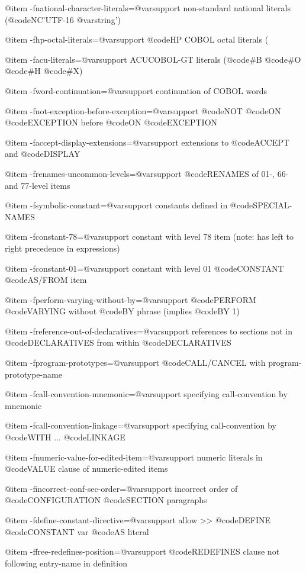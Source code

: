 @item -fnational-character-literals=@var{support}
non-standard national literals (@code{NC'UTF-16 @var{string}'})

@item -fhp-octal-literals=@var{support}
@code{HP} COBOL octal literals (%

@item -facu-literals=@var{support}
ACUCOBOL-GT literals (@code{#B} @code{#O} @code{#H} @code{#X})

@item -fword-continuation=@var{support}
continuation of COBOL words

@item -fnot-exception-before-exception=@var{support}
@code{NOT} @code{ON} @code{EXCEPTION} before @code{ON} @code{EXCEPTION}

@item -faccept-display-extensions=@var{support}
extensions to @code{ACCEPT} and @code{DISPLAY}

@item -frenames-uncommon-levels=@var{support}
@code{RENAMES} of 01-, 66- and 77-level items

@item -fsymbolic-constant=@var{support}
constants defined in @code{SPECIAL-NAMES}

@item -fconstant-78=@var{support}
constant with level 78 item (note: has left to right precedence in expressions)

@item -fconstant-01=@var{support}
constant with level 01 @code{CONSTANT} @code{AS/FROM} item

@item -fperform-varying-without-by=@var{support}
@code{PERFORM} @code{VARYING} without @code{BY} phrase (implies @code{BY 1})

@item -freference-out-of-declaratives=@var{support}
references to sections not in @code{DECLARATIVES} from within @code{DECLARATIVES}

@item -fprogram-prototypes=@var{support}
@code{CALL/CANCEL} with program-prototype-name

@item -fcall-convention-mnemonic=@var{support}
specifying call-convention by mnemonic

@item -fcall-convention-linkage=@var{support}
specifying call-convention by @code{WITH} ... @code{LINKAGE}

@item -fnumeric-value-for-edited-item=@var{support}
numeric literals in @code{VALUE} clause of numeric-edited items

@item -fincorrect-conf-sec-order=@var{support}
incorrect order of @code{CONFIGURATION} @code{SECTION} paragraphs

@item -fdefine-constant-directive=@var{support}
allow >> @code{DEFINE} @code{CONSTANT} var @code{AS} literal

@item -ffree-redefines-position=@var{support}
@code{REDEFINES} clause not following entry-name in definition


